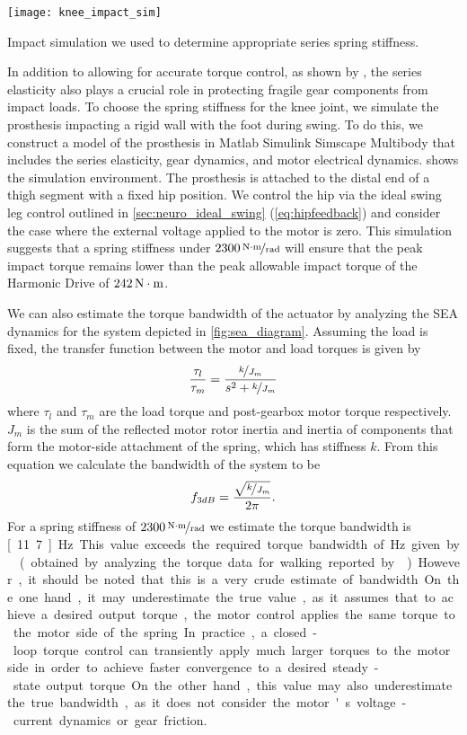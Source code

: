 \begin{marginfigure}[2.5in]
    \centering 
    \texttt{[image: knee\_impact\_sim]}
    \caption{Impact simulation we used to determine appropriate series spring
    stiffness.}\label{fig:knee_impact_sim}
\end{marginfigure}
In addition to allowing for accurate torque control, as shown by
\citet{au2007biomechanical,au2008powered}, the series elasticity also plays a
crucial role in protecting fragile gear components from impact loads. To choose
the spring stiffness for the knee joint, we simulate the prosthesis impacting a
rigid wall with the foot during swing. To do this, we construct a model of the
prosthesis in Matlab Simulink Simscape Multibody that includes the
series elasticity, gear dynamics, and motor electrical dynamics.
 shows the simulation environment. The prosthesis is
attached to the distal end of a thigh segment with a fixed hip position. We
control the hip via the ideal swing leg control outlined in
\cref{sec:neuro_ideal_swing} (\cref{eq:hipfeedback}) and consider the case where
the external voltage applied to the motor is zero. This simulation suggests that
a spring stiffness under $\unitfrac[2300]{N \cdot m}{rad}$ will ensure that the
peak impact torque remains lower than the peak allowable impact torque of the
Harmonic Drive of $\unit[242]{N \cdot m}$.

We can also estimate the torque bandwidth of the actuator by analyzing the SEA
dynamics for the system depicted in \cref{fig:sea_diagram}. Assuming the load
is fixed, the transfer function between the motor and load torques is given by
\begin{align}
    \frac{\tau_l}{\tau_m} = \frac{\nicefrac{k}{J_m}}{s^2 + \nicefrac{k}{J_m}}
\end{align}
where $\tau_l$ and $\tau_m$ are the load torque and post-gearbox motor torque
respectively. $J_m$ is the sum of the reflected motor rotor inertia and inertia
of components that form the motor-side attachment of the spring, which has
stiffness $k$. From this equation we calculate the bandwidth of the system
to be
\begin{align}
    f_{3 dB} = \frac{\sqrt{\nicefrac{k}{J_m}}}{2 \pi}.
\end{align}
For a spring stiffness of $\unitfrac[2300]{N \cdot m}{rad}$ we estimate the
torque bandwidth is \unit[11.7]{Hz}. This value exceeds the required torque
bandwidth of \unit[4]{Hz} given by \citet{sergi2012design} (obtained by
analyzing the torque data for walking reported by
\citet{winter2009biomechanics}). However, it should be noted that this is a very
crude estimate of bandwidth. On the one hand, it may underestimate the true
value, as it assumes that to achieve a desired output torque, the motor control
applies the same torque to the motor side of the spring. In practice, a
closed-loop torque control can transiently apply much larger torques to the
motor side in order to achieve faster convergence to a desired steady-state
output torque. On the other hand, this value may also underestimate the true
bandwidth, as it does not consider the motor's voltage-current dynamics or gear
friction.

